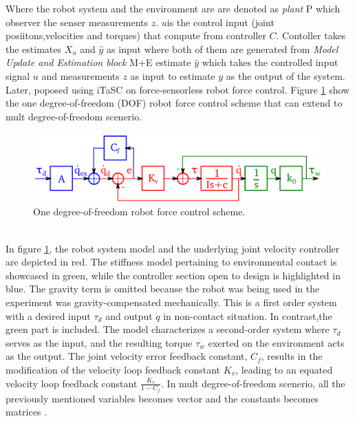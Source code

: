 \documentclass[report.tex]{subfiles}
\begin{document}
    Where the robot system and the environment are are denoted as \textit{plant} P which observer the senser measurements $z$. $u$is the control input (joint posiitons,velocities and torques) that compute from controller $C$. Contoller takes the estimates $X_u$ and $\widehat{y}$ as input where both of them are generated from \textit{Model Update and Estimation block} M+E  estimate $\widehat{y}$ which takes the controlled input signal $u$ and measurements $z$ as input to estimate $y$ as the output of the system.\\
    Later, \cite{vanthienen2013force} poposed using iTaSC on force-sensorless robot force control. Figure \ref{fig:itasc_nosensor} show the one degree-of-freedom (DOF) robot force control scheme that can extend to mult degree-of-freedom scenerio.\\
    \begin{figure}[h!]
        \centering
        \includegraphics[width=0.8\linewidth]{images/iTaSC_nosensor.png}
        \caption{One degree-of-freedom robot force control scheme.\cite{vanthienen2013force}}
        \label{fig:itasc_nosensor}
    \end{figure}\\
    In figure \ref{fig:itasc_nosensor}, the robot system model and the underlying joint velocity controller are depicted in red. The stiffness model pertaining to environmental contact is showcased in green, while the controller section open to design is highlighted in blue. The gravity term is omitted because the robot was being used in the experiment was gravity-compensated mechanically. This is a first order system with a desired input $\tau_d$ and output $\dot{q}$ in non-contact situation. In contrast,the green part is included. The model characterizes a second-order system where $\tau_d$ serves as the input, and the resulting torque $\tau_w$ exerted on the environment acts as the output. The joint velocity error feedback constant, $C_f$, results in the modification of the velocity loop feedback constant $K_v$, leading to an equated velocity loop feedback constant $\frac{K_v}{1-C_f}$. In mult degree-of-freedom scenerio, all the previously mentioned variables becomes vector and the constants becomes matrices \cite{vanthienen2013force}.
\end{document}
